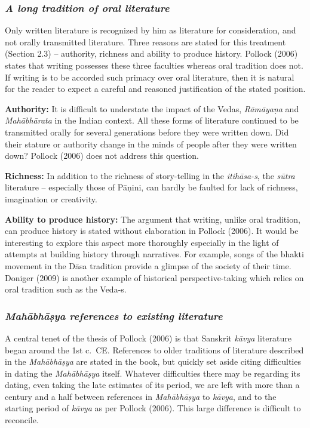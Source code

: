 \subsubsection{{\sl A long tradition of oral literature}}

Only written literature is recognized by him as literature for consideration, and not orally transmitted literature. Three reasons are stated for this treatment (Section 2.3) – authority, richness and ability to produce history. Pollock (2006) states that writing possesses these three faculties whereas oral tradition does not. If writing is to be accorded such primacy over oral literature, then it is natural for the reader to expect a careful and reasoned justification of the stated position.

{\bf Authority:} It is difficult to understate the impact of the Vedas, {\sl Rāmāyaṇa} and {\sl Mahābhārata} in the Indian context. All these forms of literature continued to be transmitted orally for several generations before they were written down. Did their stature or authority change in the minds of people after they were written down?  Pollock (2006) does not address this question.

{\bf Richness:} In addition to the richness of story-telling in the {\sl itihāsa-s}, the {\sl sūtra} literature – especially those of Pāṇini, can hardly be faulted for lack of richness, imagination or creativity.

{\bf Ability to produce history:} The argument that writing, unlike oral tradition, can produce history is stated without elaboration in Pollock (2006). It would be interesting to explore this aspect more thoroughly especially in the light of attempts at building history through narratives. For example, songs of the bhakti movement in the Dāsa tradition provide a glimpse of the society of their time. Doniger (2009) is another example of historical perspective-taking which relies on oral tradition such as the Veda-s.
\newpage

\subsubsection{{\sl Mahābhāṣya references to existing literature}}

A central tenet of the thesis of Pollock (2006) is that Sanskrit {\sl kāvya} literature began around the 1st c.\ CE. References to older traditions of literature described in the {\sl Mahābhāṣya} are stated in the book, but quickly set aside citing difficulties in dating the {\sl Mahābhāṣya} itself. Whatever difficulties there may be regarding its dating, even taking the late estimates of its period, we are left with more than a century and a half between references in {\sl Mahābhāṣya} to {\sl kāvya}, and to the starting period of {\sl kāvya} as per Pollock (2006). This large difference is difficult to reconcile. 

